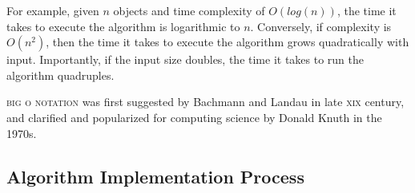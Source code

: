 \documentclass[a4paper]{article}
\begin{document}
\begin{description}
        For example, given $n$ objects and time complexity of $O(log(n))$, the
        time it takes to execute the algorithm is logarithmic to $n$.
        Conversely, if complexity is $O(n^2)$, then the time it takes to
        execute the algorithm grows quadratically with input. Importantly, if
        the input size doubles, the time it takes to run the algorithm
        quadruples.

        \textsc{big o notation} was first suggested by
        Bachmann\cite{bachmann1894analytische} and Landau\cite{landau1911} in
        late \textsc{xix} century, and clarified and popularized for computing
        science by Donald Knuth\cite{knuth1976big} in the 1970s.

\end{description}

\clearpage

\subsection{Algorithm Implementation Process}
\label{sec:algorithm-implementation-process}

\end{document}
